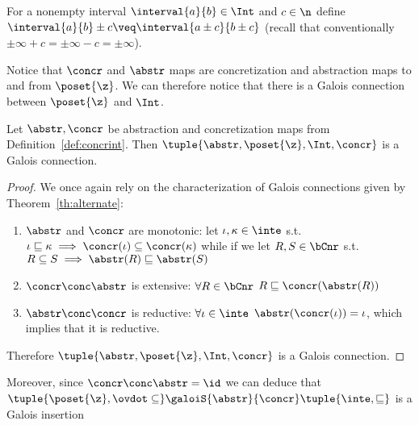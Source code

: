 \begin{definition}
  For a nonempty interval \(\interval{a}{b} \in \Int\) and
  \(c \in \n\) define
  \(\interval{a}{b} \pm c \veq \interval{a\pm c}{b\pm c}\) (recall
  that conventionally \(\pm \infty + c = \pm\infty - c = \pm\infty\)).
\end{definition}

Notice that \(\concr\) and \(\abstr\) maps are concretization and
abstraction maps to and from \(\poset{\z}\). We can therefore notice
that there is a Galois connection between \(\poset{\z}\) and \(\Int\).

\begin{lemma}\label{le:inteposetz}
  Let \(\abstr,\concr\) be abstraction and concretization maps from
  Definition~\ref{def:concrint}. Then
  \(\tuple{\abstr, \poset{\z}, \Int, \concr}\) is a Galois connection.
\end{lemma}

\begin{proof}
  We once again rely on the characterization of Galois connections
  given by Theorem~\ref{th:alternate}:
  \begin{enumerate}[label = (\roman*)]
  \item \(\abstr\) and \(\concr\) are monotonic: let
    \(\iota, \kappa\in\inte\) s.t.\
    \(\iota \sqsubseteq \kappa \implies \concr(\iota) \subseteq
    \concr(\kappa)\) while if we let \(R,S \in \bCnr\) s.t.\
    \(R\subseteq S \implies \abstr(R) \sqsubseteq \abstr(S)\)
  \item \(\concr \conc \abstr\) is extensive: \(\forall R \in \bCnr\)
    \(R \sqsubseteq \concr(\abstr(R))\)
  \item \(\abstr\conc\concr\) is reductive:
    \(\forall \iota \in \inte\) \(\abstr(\concr(\iota)) = \iota\),
    which implies that it is reductive.
  \end{enumerate}
  Therefore \(\tuple{\abstr, \poset{\z}, \Int, \concr}\) is a Galois
  connection.
\end{proof}

Moreover, since \(\concr \conc \abstr = \id\) we can deduce that
\(\tuple{\poset{\z}, \ovdot\subseteq} \galoiS{\abstr}{\concr}
\tuple{\inte, \sqsubseteq}\) is a Galois insertion
